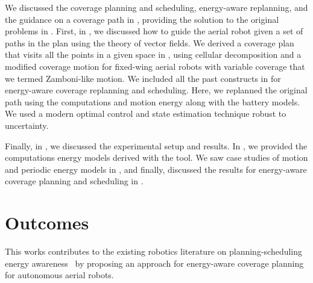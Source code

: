 We discussed the coverage planning and scheduling, energy-aware replanning, and the guidance on a coverage path in , providing the solution to the original problems in . First, in , we discussed how to guide the aerial robot given a set of paths in the plan using the theory of vector fields. We derived a coverage plan that visits all the points in a given space in , using cellular decomposition and a modified coverage motion for fixed-wing aerial robots with variable coverage that we termed Zamboni-like motion. We included all the past constructs in  for energy-aware coverage replanning and scheduling. Here, we replanned the original path using the computations and motion energy along with the battery models. We used a modern optimal control and state estimation technique robust to uncertainty. 

Finally, in , we discussed the experimental setup and results. In , we provided the computations energy models derived with the \powprof{} tool. We saw case studies of motion and periodic energy models in , and finally, discussed the results for energy-aware coverage planning and scheduling in .


\section{Outcomes}

This works contributes to the existing robotics literature on planning-scheduling energy awareness~\citep{mei2005case,mei2006deployment,brateman2006energy,zhang2007low,sadrpour2013experimental,sadrpour2013mission,ondruska2015scheduled,lahijanian2018resource,sudhakar2020balancing} by proposing an approach for energy-aware coverage planning for autonomous aerial robots.

